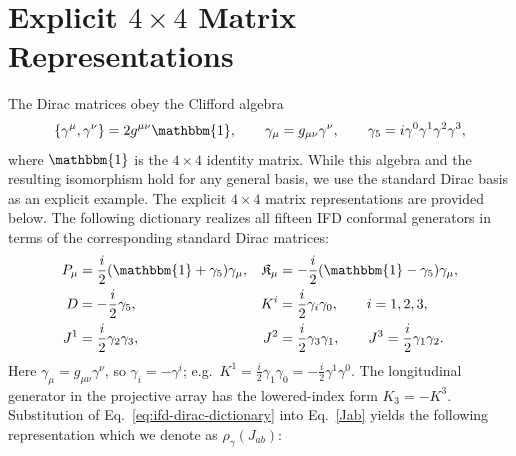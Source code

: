 \documentclass[foundations,article,submit,pdftex,moreauthors]{Definitions/mdpi}
\begin{document}
\section{Explicit \texorpdfstring{$4\times 4$}{4x4} Matrix Representations}
\label{app:explicit_matrices}
The Dirac matrices obey the Clifford algebra
\begin{align}
\{\gamma^\mu,\gamma^\nu\}=2g^{\mu\nu}\mathbbm{1},\qquad
\gamma_\mu=g_{\mu\nu}\gamma^\nu,\qquad
\gamma_5=i\gamma^0\gamma^1\gamma^2\gamma^3,
\end{align}
where $\mathbbm{1}$ is the $4\times 4$ identity matrix. While this algebra and the resulting isomorphism hold for any general basis, we use the standard Dirac basis as an explicit example. The explicit $4\times 4$ matrix representations are provided below. The following dictionary realizes all fifteen IFD conformal generators
in terms of the corresponding standard Dirac matrices:
\begin{align}
P_\mu&=\frac{i}{2}(\mathbbm{1}+\gamma_5)\gamma_\mu,
&\mathfrak{K}_\mu&=-\frac{i}{2}(\mathbbm{1}-\gamma_5)\gamma_\mu,\nonumber\\
D&={-}\frac{i}{2}\gamma_5,
&K^i&=\frac{i}{2}\gamma_i\gamma_0,\qquad i=1,2,3,\nonumber\\
J^1&=\frac{i}{2}\gamma_2\gamma_3,
&J^2&=\frac{i}{2}\gamma_3\gamma_1,
\qquad J^3=\frac{i}{2}\gamma_1\gamma_2.
\label{eq:ifd-dirac-dictionary}
\end{align}
{Here $\gamma_\mu=g_{\mu\nu}\gamma^\nu$, so $\gamma_i=-\gamma^i$; e.g.\ $K^1=\frac{i}{2}\gamma_1\gamma_0=-\frac{i}{2}\gamma^1\gamma^0$.} The longitudinal generator in the projective array has the lowered-index
form $K_3=-K^3$. Substitution of Eq.~\eqref{eq:ifd-dirac-dictionary} into
Eq.~\eqref{Jab} yields the following representation which we denote as $\rho_\gamma(J_{ab})$: \cite{Dirac1936, Hepner1962, Weinberg_2010}
\begingroup\footnotesize
\end{document}
